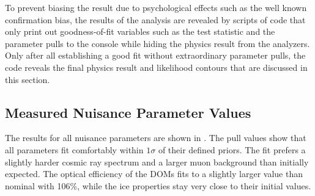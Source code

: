 To prevent biasing the result due to psychological effects such as the well known confirmation bias, the results of the analysis are revealed by scripts of code that only print out goodness-of-fit variables such as the test statistic and the parameter pulls to the console while hiding the physics result from the analyzers. Only after all establishing a good fit without extraordinary parameter pulls, the code reveals the final physics result and likelihood contours that are discussed in this section.

\subsection{Measured Nuisance Parameter Values}
The results for all nuisance parameters are shown in . The pull values show that all parameters fit comfortably within $1\sigma$ of their defined priors. The fit prefers a slightly harder cosmic ray spectrum and a larger muon background than initially expected. The optical efficiency of the DOMs fits to a slightly larger value than nominal with 106\%, while the ice properties stay very close to their initial values.



